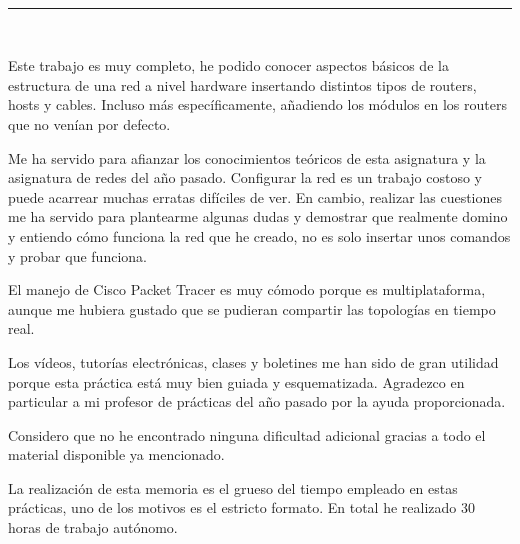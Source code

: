 
\begin{center}
	{\fboxrule=4pt } \\
	\setcounter{chapter}{4}
	\setcounter{section}{0}
	\rule{15cm}{0pt} \\
\end{center}
 
\par Este trabajo es muy completo, he podido conocer aspectos básicos de la estructura de una red a nivel hardware insertando distintos tipos de routers, hosts y cables. Incluso más específicamente, añadiendo los módulos en los routers que no venían por defecto.
\par Me ha servido para afianzar los conocimientos teóricos de esta asignatura y la asignatura de redes del año pasado. Configurar la red es un trabajo costoso y puede acarrear muchas erratas difíciles de ver. En cambio, realizar las cuestiones me ha servido para plantearme algunas dudas y demostrar que realmente domino y entiendo cómo funciona la red que he creado, no es solo insertar unos comandos y probar que funciona.
\par El manejo de Cisco Packet Tracer es muy cómodo porque es multiplataforma, aunque me hubiera gustado que se pudieran compartir las topologías en tiempo real.
\par Los vídeos, tutorías electrónicas, clases y boletines me han sido de gran utilidad porque esta práctica está muy bien guiada y esquematizada. Agradezco en particular a mi profesor de prácticas del año pasado por la ayuda proporcionada.
\par Considero que no he encontrado ninguna dificultad adicional gracias a todo el material disponible ya mencionado.
\par La realización de esta memoria es el grueso del tiempo empleado en estas prácticas, uno de los motivos es el estricto formato. En total he realizado 30 horas de trabajo autónomo.
